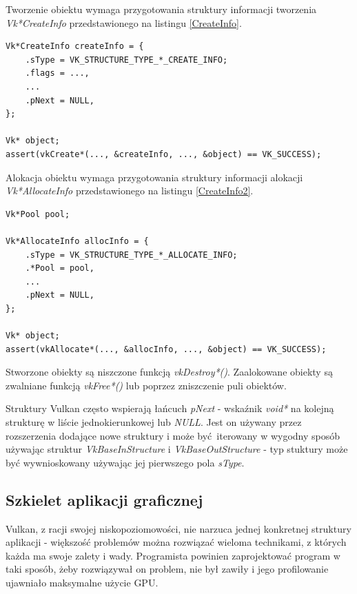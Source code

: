 Tworzenie obiektu wymaga przygotowania struktury informacji tworzenia \textit{Vk*CreateInfo} przedstawionego na listingu \ref{CreateInfo}.
\lstset{language=C}
\begin{lstlisting}[caption={Tworzenie obiektu Vulkan},captionpos=b,label={CreateInfo}]
Vk*CreateInfo createInfo = {
	.sType = VK_STRUCTURE_TYPE_*_CREATE_INFO;
	.flags = ...,
	...
	.pNext = NULL,
};

Vk* object;
assert(vkCreate*(..., &createInfo, ..., &object) == VK_SUCCESS);
\end{lstlisting}

Alokacja obiektu wymaga przygotowania struktury informacji alokacji \textit{Vk*AllocateInfo} przedstawionego na listingu \ref{CreateInfo2}.
\lstset{language=C}
\begin{lstlisting}[caption={Alokacja obiektu Vulkan},captionpos=b,label={CreateInfo2}]
Vk*Pool pool;

Vk*AllocateInfo allocInfo = {
	.sType = VK_STRUCTURE_TYPE_*_ALLOCATE_INFO;
	.*Pool = pool,
	...
	.pNext = NULL,
};

Vk* object;
assert(vkAllocate*(..., &allocInfo, ..., &object) == VK_SUCCESS);
\end{lstlisting}

Stworzone obiekty są niszczone funkcją \textit{vkDestroy*()}.
Zaalokowane obiekty są zwalniane funkcją \textit{vkFree*()} lub poprzez zniszczenie puli obiektów.

Struktury Vulkan często wspierają łańcuch \textit{pNext} - wskaźnik \textit{void*} na kolejną strukturę w liście jednokierunkowej lub \textit{NULL}. Jest on używany przez rozszerzenia dodające nowe struktury i może być iterowany w wygodny sposób używając struktur \textit{VkBaseInStructure} i \textit{VkBaseOutStructure} - typ stuktury może być wywnioskowany używając jej pierwszego pola \textit{sType}.

\subsection{Szkielet aplikacji graficznej}

Vulkan, z racji swojej niskopoziomowości, nie narzuca jednej konkretnej struktury aplikacji - większość problemów można rozwiązać wieloma technikami, z których każda ma swoje zalety i wady.
Programista powinien zaprojektować program w taki sposób, żeby rozwiązywał on problem, nie był zawiły i jego profilowanie ujawniało maksymalne użycie GPU.


